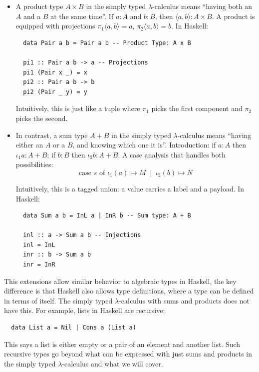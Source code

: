 \begin{itemize}
\item A product type $A \times B$ in the simply typed $\lambda$-calculus means ``having both an $A$ and a $B$ at the same time''. If $a : A$ and $b : B$, then $\langle a,b\rangle : A \times B$. A product is equipped with projections $\pi_{1}\langle a,b \rangle = a$, $\pi_{2}\langle a,b\rangle = b$. In Haskell:
\begin{verbatim}
  data Pair a b = Pair a b -- Product Type: A x B
  
  pi1 :: Pair a b -> a -- Projections
  pi1 (Pair x _) = x
  pi2 :: Pair a b -> b
  pi2 (Pair _ y) = y
\end{verbatim}

Intuitively, this is just like a tuple where $\pi_{1}$ picks the first component and $\pi_{2}$ picks the second.

\item In contrast, a sum type $A + B$ in the simply typed $\lambda$-calculus means ``having either an $A$ or a $B$, and knowing which one it is''.
Introduction: if $a : A$ then $\iota_{1} a : A + B$; if $b : B$ then $\iota_{2} b : A + B$. A case analysis that handles both possibilities:  
\[
  \text{case } s \text{ of } 
    \iota_{1}(a) \mapsto M \;\;|\;\;
    \iota_{2}(b) \mapsto N
  \]
  
Intuitively, this is a tagged union: a value carries a label and a payload. In Haskell:
\begin{verbatim}
  data Sum a b = InL a | InR b -- Sum type: A + B

  inl :: a -> Sum a b -- Injections
  inl = InL
  inr :: b -> Sum a b
  inr = InR
\end{verbatim}

\end{itemize}

This extensions allow similar behavior to algebraic types in Haskell, the key difference is that Haskell also allows type definitions, where a type can be defined in terms of itself. The simply typed $\lambda$-calculus with sums and products does not have this. For example, lists in Haskell are recursive:  
\begin{verbatim}
  data List a = Nil | Cons a (List a)
\end{verbatim}

This says a list is either empty or a pair of an element and another list.  
Such recursive types go beyond what can be expressed with just sums and products in the simply typed $\lambda$-calculus and what we will cover.

